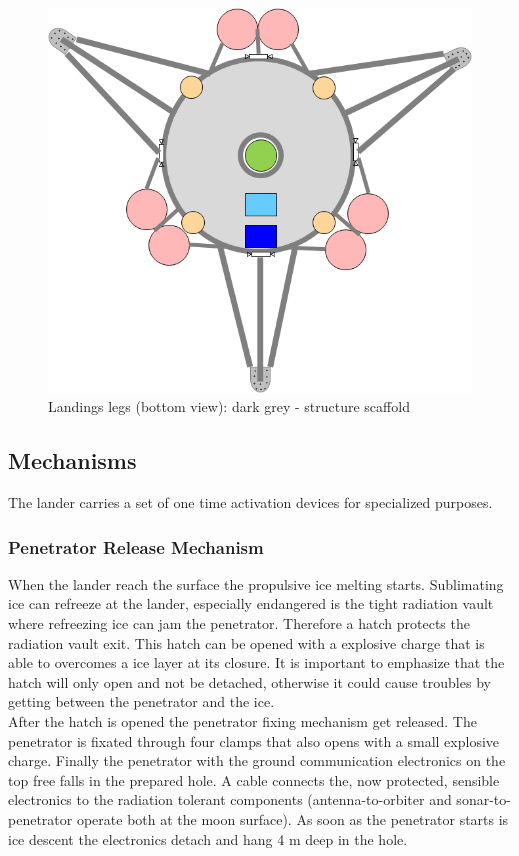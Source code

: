 \begin{figure}[htb]
	\centering
	\includegraphics[width=\textwidth]{figures/Lander/aaronlandinglegs}
	\caption{Landings legs (bottom view): dark grey - structure scaffold \label{fig:alanderlegs}}
\end{figure}

\subsection{Mechanisms}
The lander carries a set of one time activation devices for specialized purposes.

\subsubsection{Penetrator Release Mechanism}
When the lander reach the surface the propulsive ice melting starts. Sublimating ice can refreeze at the lander, especially endangered is the tight radiation vault where refreezing ice can jam the penetrator. Therefore a hatch protects the radiation vault exit. This hatch can be opened with a explosive charge that is able to overcomes a ice layer at its closure. It is important to emphasize that the hatch will only open and not be detached, otherwise it could cause troubles by getting between the penetrator and the ice.\\
After the hatch is opened the penetrator fixing mechanism get released. The penetrator is fixated through four clamps that also opens with a small explosive charge. Finally the penetrator with the ground communication electronics on the top free falls in the prepared hole. A cable connects the, now protected, sensible electronics to the radiation tolerant components (antenna-to-orbiter and sonar-to-penetrator operate both at the moon surface). As soon as the penetrator starts is ice descent the electronics detach and hang 4 m deep in the hole.\\


